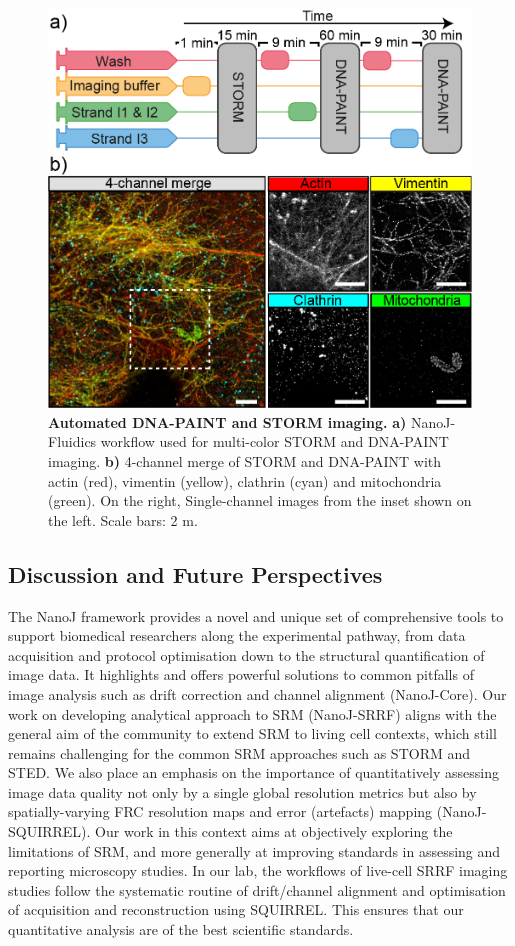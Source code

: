 \begin{figure}[!t]
    \centering
    \includegraphics[width=\linewidth]{Figures/Figure5_v2.png}
    \caption{\textbf{Automated DNA-PAINT and STORM imaging.} \textbf{a)} NanoJ-Fluidics workflow used for multi-color STORM and DNA-PAINT imaging. \textbf{b)} 4-channel merge of STORM and DNA-PAINT with actin (red), vimentin (yellow), clathrin (cyan) and mitochondria (green). On the right, Single-channel images from the inset shown on the left. Scale bars: 2 \textmu{}m.}
    \label{fig:PAINT}
\end{figure}

\subsection*{Discussion and Future Perspectives}
 The NanoJ framework provides a novel and unique set of comprehensive tools to support biomedical researchers along the experimental pathway, from data acquisition and protocol optimisation down to the structural quantification of image data. It highlights and offers powerful solutions to common pitfalls of image analysis such as drift correction and channel alignment (NanoJ-Core). Our work on developing analytical approach to SRM (NanoJ-SRRF) aligns with the general aim of the community to extend SRM to living cell contexts, which still remains challenging for the common SRM approaches such as STORM and STED. We also place an emphasis on the importance of quantitatively assessing image data quality not only by a single global resolution metrics but also by spatially-varying FRC resolution maps and error (artefacts) mapping (NanoJ-SQUIRREL). Our work in this context aims at objectively exploring the limitations of SRM, and more generally at improving standards in assessing and reporting microscopy studies. In our lab, the workflows of live-cell SRRF imaging studies follow the systematic routine of drift/channel alignment and optimisation of acquisition and reconstruction using SQUIRREL. This ensures that our quantitative analysis are of the best scientific standards.
 

